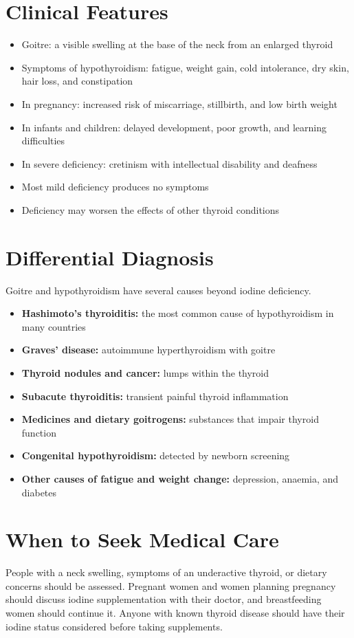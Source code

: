 \section*{Clinical Features}
\begin{itemize}
    \item Goitre: a visible swelling at the base of the neck from an enlarged thyroid
    \item Symptoms of hypothyroidism: fatigue, weight gain, cold intolerance, dry skin, hair loss, and constipation
    \item In pregnancy: increased risk of miscarriage, stillbirth, and low birth weight
    \item In infants and children: delayed development, poor growth, and learning difficulties
    \item In severe deficiency: cretinism with intellectual disability and deafness
    \item Most mild deficiency produces no symptoms
    \item Deficiency may worsen the effects of other thyroid conditions
\end{itemize}

\section*{Differential Diagnosis}
Goitre and hypothyroidism have several causes beyond iodine deficiency.
\begin{itemize}
    \item \textbf{Hashimoto's thyroiditis:} the most common cause of hypothyroidism in many countries
    \item \textbf{Graves' disease:} autoimmune hyperthyroidism with goitre
    \item \textbf{Thyroid nodules and cancer:} lumps within the thyroid
    \item \textbf{Subacute thyroiditis:} transient painful thyroid inflammation
    \item \textbf{Medicines and dietary goitrogens:} substances that impair thyroid function
    \item \textbf{Congenital hypothyroidism:} detected by newborn screening
    \item \textbf{Other causes of fatigue and weight change:} depression, anaemia, and diabetes
\end{itemize}

\section*{When to Seek Medical Care}
People with a neck swelling, symptoms of an underactive thyroid, or dietary concerns should be assessed. Pregnant women and women planning pregnancy should discuss iodine supplementation with their doctor, and breastfeeding women should continue it. Anyone with known thyroid disease should have their iodine status considered before taking supplements.

